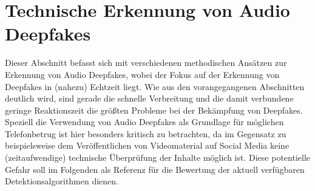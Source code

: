 \section{Technische Erkennung von Audio Deepfakes}
Dieser Abschnitt befasst sich mit verschiedenen methodischen Ansätzen zur Erkennung von Audio Deepfakes, wobei der Fokus auf der Erkennung von Deepfakes in (nahezu) Echtzeit liegt.
Wie aus den vorangegangenen Abschnitten deutlich wird, sind gerade die schnelle Verbreitung und die damit verbundene geringe Reaktionszeit die größten Probleme bei der Bekämpfung von Deepfakes.
Speziell die Verwendung von Audio Deepfakes als Grundlage für möglichen Telefonbetrug ist hier besonders kritisch zu betrachten, da im Gegensatz zu beispielsweise dem Veröffentlichen von Videomaterial auf Social Media keine (zeitaufwendige) technische Überprüfung der Inhalte möglich ist.
Diese potentielle Gefahr soll im Folgenden als Referenz für die Bewertung der aktuell verfügbaren Detektionsalgorithmen dienen.

